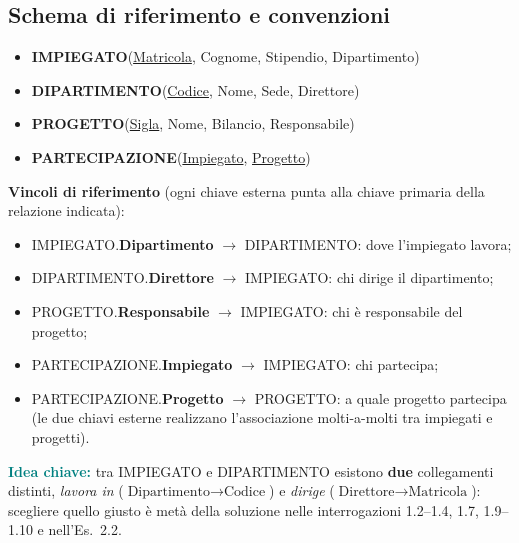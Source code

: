 \documentclass[12pt, a4paper]{article}
\begin{document}
\subsection{Schema di riferimento e convenzioni}

\begin{tcolorbox}[colback=lightergray!10, colframe=tocsec, title=\textbf{Schema relazionale (chiavi primarie sottolineate)}]
\begin{itemize}
\item \textbf{IMPIEGATO}(\underline{Matricola}, Cognome, Stipendio, Dipartimento)
\item \textbf{DIPARTIMENTO}(\underline{Codice}, Nome, Sede, Direttore)
\item \textbf{PROGETTO}(\underline{Sigla}, Nome, Bilancio, Responsabile)
\item \textbf{PARTECIPAZIONE}(\underline{Impiegato}, \underline{Progetto})
\end{itemize}
\end{tcolorbox}

\textbf{Vincoli di riferimento} (ogni chiave esterna punta alla chiave primaria della relazione indicata):
\begin{itemize}
\item IMPIEGATO.\textbf{Dipartimento} $\rightarrow$ DIPARTIMENTO: dove l'impiegato lavora;
\item DIPARTIMENTO.\textbf{Direttore} $\rightarrow$ IMPIEGATO: chi dirige il dipartimento;
\item PROGETTO.\textbf{Responsabile} $\rightarrow$ IMPIEGATO: chi è responsabile del progetto;
\item PARTECIPAZIONE.\textbf{Impiegato} $\rightarrow$ IMPIEGATO: chi partecipa;
\item PARTECIPAZIONE.\textbf{Progetto} $\rightarrow$ PROGETTO: a quale progetto partecipa (le due chiavi esterne realizzano l'associazione molti-a-molti tra impiegati e progetti).
\end{itemize}

\textcolor{teal}{\textbf{Idea chiave:}} tra IMPIEGATO e DIPARTIMENTO esistono \textbf{due} collegamenti distinti, \emph{lavora in} ($\text{Dipartimento}\to\text{Codice}$) e \emph{dirige} ($\text{Direttore}\to\text{Matricola}$): scegliere quello giusto è metà della soluzione nelle interrogazioni 1.2--1.4, 1.7, 1.9--1.10 e nell'Es.~2.2.
\end{document}

